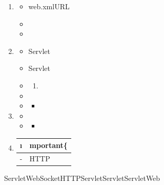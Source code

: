 \begin{enumerate}
\def\labelenumi{\arabic{enumi}.}
\item
  \important{}

  \begin{itemize}
  \item
    web.xmlURL
  \item
  \item
  \end{itemize}
\item
  \important{}

  \begin{itemize}
  \item
    Servlet
  \item
    Servlet
  \item
    \begin{enumerate}
    \def\labelenumii{\arabic{enumii}.}
        \item
      \important{}
    \end{enumerate}
  \item
  \item
    \begin{itemize}
    \item
    \end{itemize}
  \end{itemize}
\item
  \important{}

  \begin{itemize}
  \item
  \item
    \begin{itemize}
    \tightlist
    \item
    \end{itemize}
  \end{itemize}
\item
  \begin{longtable}[]{@{}ll@{}}
  \toprule\noalign{}
  \i & mportant\{} \\
  \midrule\noalign{}
  \endhead
  \bottomrule\noalign{}
  \endlastfoot
  - & HTTP \\
  \end{longtable}
\end{enumerate}

Servlet\important{}\important{}\important{}WebSocket\important{}HTTPServletServletServletWeb

